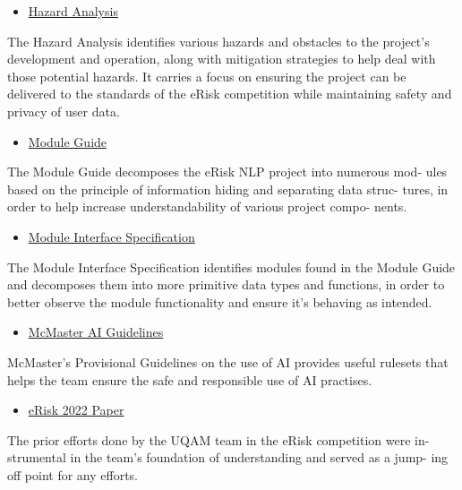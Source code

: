 \documentclass[12pt, titlepage]{article}
\begin{document}
\begin{itemize}
	\item \href{https://github.com/MichaelBreau/nlp-mentalhealth/blob/main/docs/HazardAnalysis/HazardAnalysis.pdf}{Hazard Analysis}
\end{itemize}
The Hazard Analysis identifies various hazards and obstacles to the project’s
development and operation, along with mitigation strategies to help deal
with those potential hazards. It carries a focus on ensuring the project can
be delivered to the standards of the eRisk competition while maintaining
safety and privacy of user data.

\begin{itemize}
	\item \href{https://github.com/MichaelBreau/nlp-mentalhealth/blob/main/docs/Design/SoftArchitecture/MG.pdf}{Module Guide}
\end{itemize}
The Module Guide decomposes the eRisk NLP project into numerous mod-
ules based on the principle of information hiding and separating data struc-
tures, in order to help increase understandability of various project compo-
nents.

\begin{itemize}
	\item \href{https://github.com/MichaelBreau/nlp-mentalhealth/blob/main/docs/Design/SoftDetailedDes/MIS.pdf}{Module Interface Specification}
\end{itemize}
The Module Interface Specification identifies modules found in the Module
Guide and decomposes them into more primitive data types and functions,
in order to better observe the module functionality and ensure it’s behaving
as intended.

\begin{itemize}
	\item \href{https://mi.mcmaster.ca/generative-artificial-intelligence-in-teaching-and-learning/#tab-content-provisional-guidelines}{McMaster AI Guidelines}
\end{itemize}
McMaster’s Provisional Guidelines on the use of AI provides useful rulesets
that helps the team ensure the safe and responsible use of
AI practises.

\begin{itemize}
	\item \href{https://ceur-ws.org/Vol-3180/paper-74.pdf}{eRisk 2022 Paper}
\end{itemize}
The prior efforts done by the UQAM team in the eRisk competition were in-
strumental in the team’s foundation of understanding and served as a jump-
ing off point for any efforts.
\end{document}
